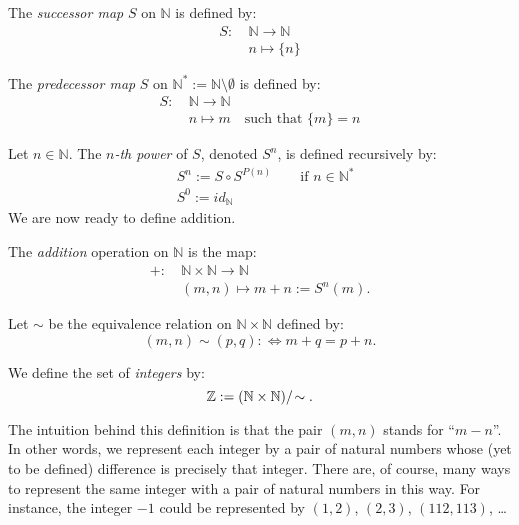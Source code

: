 \documentclass[root.tex]{subfiles}
\begin{document}
\begin{mydef}
  The \emph{successor map} $S$ on $\mathbb{N}$ is defined by:
  \begin{align*}
   S :\ & \mathbb{N}  \rightarrow \mathbb{N}\\
       & n \mapsto \{n\}
  \end{align*}
\end{mydef}

\begin{mydef}
  The \emph{predecessor map} $S$ on $\mathbb{N}^* := \mathbb{N}\setminus \emptyset$ is defined by:
  \begin{align*}
   S :\ & \mathbb{N}  \rightarrow \mathbb{N}\\
       & n \mapsto m \quad \text{such that } \{m\} = n
  \end{align*}
\end{mydef}

\begin{mydef}
Let $n \in \mathbb{N}$. The \emph{$n$-th power} of $S$, denoted $S^n$, is defined recursively by:
\begin{align*}
  &S^n := S \circ S^{P(n)} \qquad \text{if } n \in \mathbb{N}^*\\ 
  &S^0 := id_\mathbb{N}
\end{align*}
We are now ready to define addition.
\end{mydef}

\begin{mydef}
The \emph{addition} operation on $\mathbb{N}$ is the map:
\begin{align*}
   + :\ & \mathbb{N} \times \mathbb{N}  \rightarrow  \mathbb{N}\\
   & (m,n)  \mapsto  m +n:= S^n(m).
\end{align*}
\end{mydef}

\begin{mydef}
Let $\sim$ be the equivalence relation on $\mathbb{N}\times \mathbb{N}$ defined by:
$$
 (m,n) \sim (p,q) :\Leftrightarrow m+q = p+n.
$$
\end{mydef}

\begin{mydef}
 We define the set of \emph{integers} by:
$$
\mathbb{Z}\index{$\mathbb{Z}$}:=(\mathbb{N}\times\mathbb{N})/\!\sim.
$$
\end{mydef}

The intuition behind this definition is that the pair $(m,n)$ stands for ``$m-n$''. In other words, we represent each integer by a pair of natural numbers whose (yet to be defined) difference is precisely that integer. There are, of course, many ways to represent the same integer with a pair of natural numbers in this way. For instance, the integer $-1$ could be represented by $(1,2)$, $(2,3)$, $(112,113)$, \ldots
\end{document}
